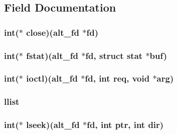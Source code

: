 \subsection{\-Field \-Documentation}
\hypertarget{structalt__dev__s_a971c646055e5b97090e1257789d40e04}{
\subsubsection[{close}]{\setlength{\rightskip}{0pt plus 5cm}int($\ast$ {\bf close})({\bf alt\-\_\-fd} $\ast$fd)}}\label{structalt__dev__s_a971c646055e5b97090e1257789d40e04}
\hypertarget{structalt__dev__s_a6dd1e33034db23119fcb7b72c43f7b00}{
\subsubsection[{fstat}]{\setlength{\rightskip}{0pt plus 5cm}int($\ast$ {\bf fstat})({\bf alt\-\_\-fd} $\ast$fd, struct stat $\ast$buf)}}\label{structalt__dev__s_a6dd1e33034db23119fcb7b72c43f7b00}
\hypertarget{structalt__dev__s_a85a75658ee2ebbe698566e4fa8a5ca47}{
\subsubsection[{ioctl}]{\setlength{\rightskip}{0pt plus 5cm}int($\ast$ {\bf ioctl})({\bf alt\-\_\-fd} $\ast$fd, int req, void $\ast$arg)}}\label{structalt__dev__s_a85a75658ee2ebbe698566e4fa8a5ca47}
\hypertarget{structalt__dev__s_a135bc0be285afc59289210771ad9c136}{
\subsubsection[{llist}]{ {\bf llist}}}\label{structalt__dev__s_a135bc0be285afc59289210771ad9c136}
\hypertarget{structalt__dev__s_ab8596a7b90d3cf8e637abbe23825c9bc}{
\subsubsection[{lseek}]{\setlength{\rightskip}{0pt plus 5cm}int($\ast$ {\bf lseek})({\bf alt\-\_\-fd} $\ast$fd, int ptr, int dir)}}\label{structalt__dev__s_ab8596a7b90d3cf8e637abbe23825c9bc}
